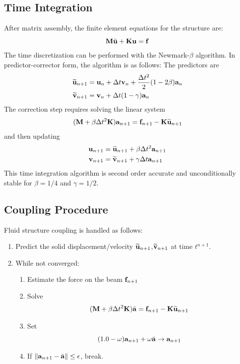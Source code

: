 \documentclass{article}
\begin{document}
\subsection{Time Integration}
After matrix assembly, the finite element equations for the structure are:
\begin{equation} {\bf M}\ddot{\bf u} + {\bf K}{\bf u} = {\bf f} \label{eq:eq5700} \end{equation}
The time discretization can be performed with the Newmark-$\beta$ algorithm.  
In predictor-corrector form, the algorithm is as follows:  The predictors are 
\begin{equation} \begin{aligned}
\widetilde{{\bf u}}_{n+1} &= {\bf u}_n + \Delta t {\bf v}_n + \frac{\Delta t^2}{2}(1-2\beta){\bf a}_n \\
\widetilde{{\bf v}}_{n+1} &= {\bf v}_n + \Delta t (1-\gamma) {\bf a}_n 
\end{aligned} \label{eq:eq5800} \end{equation}
The correction step requires solving the linear system
\begin{equation}
 ({\bf M}+\beta \Delta t^2{\bf K}){\bf a}_{n+1} = {\bf f}_{n+1} - {\bf K}\widetilde{{\bf u}}_{n+1} 
\label{eq:eq5900}
\end{equation}
and then updating
\begin{equation} \begin{aligned}
{\bf u}_{n+1} &= \widetilde{{\bf u}}_{n+1} + \beta \Delta t^2 {\bf a}_{n+1} \\
{\bf v}_{n+1} &= \widetilde{{\bf v}}_{n+1} + \gamma \Delta t {\bf a}_{n+1}
\end{aligned} \label{eq:eq6000} \end{equation}
This time integration algorithm is second order accurate and unconditionally stable for $\beta = 1/4$ and $\gamma = 1/2$.
\subsection{Coupling Procedure}
Fluid structure coupling is handled as follows:
\begin{enumerate}
\item Predict the solid displacement/velocity $\widetilde{{\bf u}}_{n+1}$,$\widetilde{{\bf v}}_{n+1}$ at time $t^{n+1}$.
\item While not converged:
  \begin{enumerate}
    \item Estimate the force on the beam ${\bf f}_{n+1}$
    \item Solve 
      \[ ({\bf M}+\beta \Delta t^2{\bf K})\bar{{\bf a}} = {\bf f}_{n+1} - {\bf K}\widetilde{{\bf u}}_{n+1} \]
    \item Set 
      \[ (1.0-\omega){\bf a}_{n+1} + \omega \bar{{\bf a}} \to {\bf a}_{n+1} \]
    \item If $\|{\bf a}_{n+1} - \bar{{\bf a}} \| \leq \epsilon$, break.
  \end{enumerate}
\end{enumerate}
 
\end{document}

